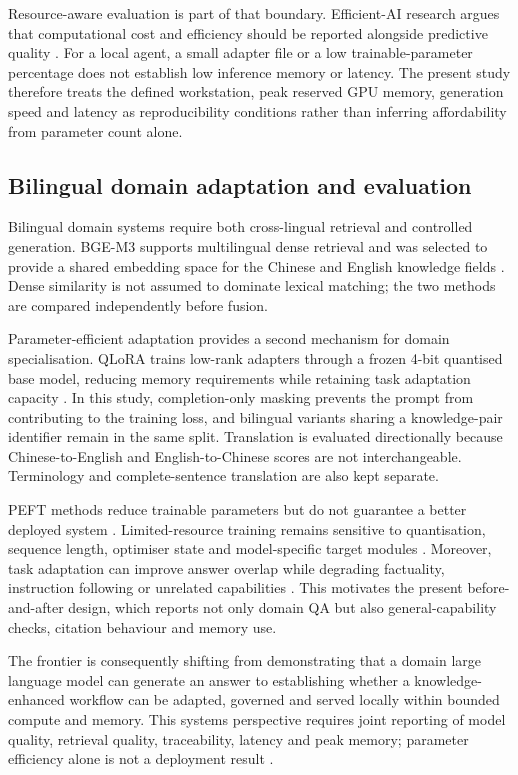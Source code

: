 Resource-aware evaluation is part of that boundary. Efficient-AI research argues that computational cost and efficiency should be reported alongside predictive quality \citep{schwartz2020green}. For a local agent, a small adapter file or a low trainable-parameter percentage does not establish low inference memory or latency. The present study therefore treats the defined workstation, peak reserved GPU memory, generation speed and latency as reproducibility conditions rather than inferring affordability from parameter count alone.

\subsection{Bilingual domain adaptation and evaluation}

Bilingual domain systems require both cross-lingual retrieval and controlled generation. BGE-M3 supports multilingual dense retrieval and was selected to provide a shared embedding space for the Chinese and English knowledge fields \citep{chen2024bgem3}. Dense similarity is not assumed to dominate lexical matching; the two methods are compared independently before fusion.

Parameter-efficient adaptation provides a second mechanism for domain specialisation. QLoRA trains low-rank adapters through a frozen 4-bit quantised base model, reducing memory requirements while retaining task adaptation capacity \citep{dettmers2023qlora}. In this study, completion-only masking prevents the prompt from contributing to the training loss, and bilingual variants sharing a knowledge-pair identifier remain in the same split. Translation is evaluated directionally because Chinese-to-English and English-to-Chinese scores are not interchangeable. Terminology and complete-sentence translation are also kept separate.

PEFT methods reduce trainable parameters but do not guarantee a better deployed system \citep{ding2023peft,wang2025peft}. Limited-resource training remains sensitive to quantisation, sequence length, optimiser state and model-specific target modules \citep{lv2024full}. Moreover, task adaptation can improve answer overlap while degrading factuality, instruction following or unrelated capabilities \citep{tian2024factuality,barnett2024finetuning}. This motivates the present before-and-after design, which reports not only domain QA but also general-capability checks, citation behaviour and memory use.

The frontier is consequently shifting from demonstrating that a domain large language model can generate an answer to establishing whether a knowledge-enhanced workflow can be adapted, governed and served locally within bounded compute and memory. This systems perspective requires joint reporting of model quality, retrieval quality, traceability, latency and peak memory; parameter efficiency alone is not a deployment result \citep{ding2023peft,lv2024full,wang2025peft}.

